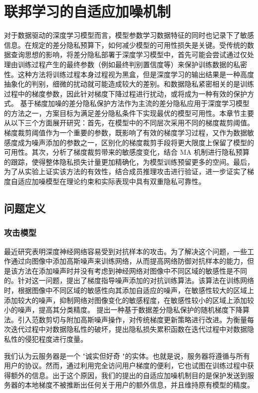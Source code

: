 \chapter{联邦学习的自适应加噪机制}
\label{ch3}
对于数据驱动的深度学习模型而言，模型参数学习数据特征的同时也记录下了敏感信息。在规定的差分隐私预算下，如何减少模型的可用性损失是关键。受传统的数据查询思想的影响，将差分隐私部署于深度学习模型中，首先可能会尝试通过仅处理由训练过程产生的最终参数（例如最终判别置信度等）来保护训练数据的私密性。这种方法将训练过程本身过程视为黑盒，但是深度学习的输出结果是一种高度抽象化的判别，细微的扰动就可能造成较大的差别。和数据隐私紧密相关的是训练过程中的梯度参数，因此针对梯度下降过程进行扰动，或将成为一种有效的保护方式。 基于梯度加噪的差分隐私保护方法作为主流的差分隐私应用于深度学习模型的方法之一，方案目标为满足差分隐私条件下实现最优的模型可用性。本章节主要从以下三个方面展开研究：首先，在模型中的不同层次采用不同的梯度裁剪阈值。梯度裁剪阈值作为一个重要的参数，既影响了有效的梯度学习过程，又作为数据敏感度成为噪声添加的参数之一，区别化的梯度裁剪手段将更大限度上保留了模型的可用性。其次，分析了梯度裁剪带来的敏感度变化，结合 MA 机制进行隐私预算的跟踪，使得整体隐私损失计量更加精确化，为模型训练预留更多的空间。最后，为了从实验上证实该方法的有效性，结合成员推理攻击进行验证，进一步证实了梯度自适应加噪模型在理论约束和实际表现中具有双重隐私可靠性。 


\section{问题定义}
\subsection{攻击模型}
最近研究表明深度神经网络容易受到对抗样本的攻击。为了解决这个问题，一些工作通过向图像中添加高斯噪声来训练网络，从而提高网络防御对抗样本的能力，但是该方法在添加噪声时并没有考虑到神经网络对图像中不同区域的敏感性是不同的。针对这一问题，提出了梯度指导噪声添加的对抗训练算法。该算法在训练网络时，根据图像中不同区域的敏感性向其添加自适应的噪声，在敏感性较大的区域上添加较大的噪声，抑制网络对图像变化的敏感程度，在敏感性较小的区域上添加较小的噪声，提高其分类精度。
提出一种基于数据差分隐私保护的随机梯度下降算法。引入范数剪切与附加高斯噪声操作，对传统梯度更新策略进行改进。为衡量每次迭代过程中对数据隐私性的破坏，提出隐私损失累积函数在迭代过程中对数据隐私性的侵犯程度进行度量。

我们认为云服务器是一个 "诚实但好奇 "的实体。也就是说，服务器将遵循与所有用户的协议。然而，通过利用完全访问用户梯度的便利，它也试图在训练过程中获得额外的信息。出于这个原因，我们的提出的自适应加噪机制目的是保护发送到服务器的本地梯度不被推断出任何关于用户的额外信息，并且维持原有模型的精度。

